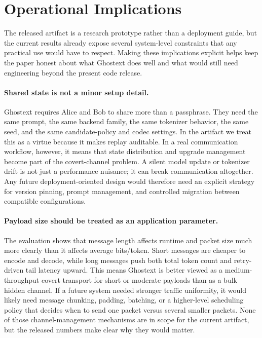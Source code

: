 \section{Operational Implications}

The released artifact is a research prototype rather than a deployment guide, but the current results already expose several system-level constraints that any practical use would have to respect. Making these implications explicit helps keep the paper honest about what Ghostext does well and what would still need engineering beyond the present code release.

\paragraph{Shared state is not a minor setup detail.} Ghostext requires Alice and Bob to share more than a passphrase. They need the same prompt, the same backend family, the same tokenizer behavior, the same seed, and the same candidate-policy and codec settings. In the artifact we treat this as a virtue because it makes replay auditable. In a real communication workflow, however, it means that state distribution and upgrade management become part of the covert-channel problem. A silent model update or tokenizer drift is not just a performance nuisance; it can break communication altogether. Any future deployment-oriented design would therefore need an explicit strategy for version pinning, prompt management, and controlled migration between compatible configurations.

\paragraph{Payload size should be treated as an application parameter.} The evaluation shows that message length affects runtime and packet size much more clearly than it affects average bits/token. Short messages are cheaper to encode and decode, while long messages push both total token count and retry-driven tail latency upward. This means Ghostext is better viewed as a medium-throughput covert transport for short or moderate payloads than as a bulk hidden channel. If a future system needed stronger traffic uniformity, it would likely need message chunking, padding, batching, or a higher-level scheduling policy that decides when to send one packet versus several smaller packets. None of those channel-management mechanisms are in scope for the current artifact, but the released numbers make clear why they would matter.

